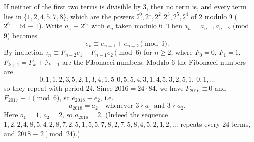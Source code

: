 If neither of the first two terms is divisible by $3$, then no term is, and every term lies in $\{1,2,4,5,7,8\}$, which are the powers $2^0,2^1,2^2,2^3,2^5,2^4$ of $2$ modulo $9$ ($2^6=64\equiv1$). Write $a_n\equiv2^{e_n}$ with $e_n$ taken modulo $6$. Then $a_n=a_{n-1}a_{n-2}$ (mod $9$) becomes
\[
e_n\equiv e_{n-1}+e_{n-2}\pmod 6 .
\]
By induction $e_n\equiv F_{n-2}e_1+F_{n-1}e_2\pmod6$ for $n\ge2$, where $F_0=0$, $F_1=1$, $F_{k+1}=F_k+F_{k-1}$ are the Fibonacci numbers. Modulo $6$ the Fibonacci numbers are
\[
0,1,1,2,3,5,2,1,3,4,1,5,0,5,5,4,3,1,4,5,3,2,5,1,\ 0,1,\dots
\]
so they repeat with period $24$. Since $2016=24\cdot84$, we have $F_{2016}\equiv0$ and $F_{2017}\equiv1\pmod 6$, so $e_{2018}\equiv e_2$, i.e.
\[
a_{2018}=a_2\quad\text{whenever }3\nmid a_1\text{ and }3\nmid a_2 .
\]
Here $a_1=1$, $a_2=2$, so $a_{2018}=\boxed{2}$. (Indeed the sequence $1,2,2,4,8,5,4,2,8,7,2,5,1,5,5,7,8,2,7,5,8,4,5,2,1,2,\dots$ repeats every $24$ terms, and $2018\equiv2\pmod{24}$.)
